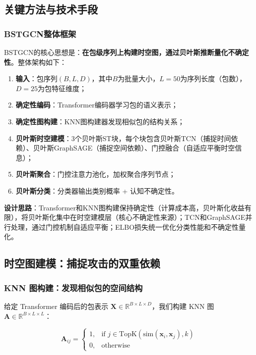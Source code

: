 \subsection{关键方法与技术手段}

\subsubsection{BSTGCN整体框架}

BSTGCN的核心思想是：\textbf{在包级序列上构建时空图，通过贝叶斯推断量化不确定性}。整体架构如下：

\begin{enumerate}
  \item \textbf{输入}：包序列$(B, L, D)$，其中$B$为批量大小，$L=50$为序列长度（包数），$D=25$为包特征维度；
  \item \textbf{确定性编码}：Transformer编码器学习包的语义表示；
  \item \textbf{确定性图构建}：KNN图构建器发现相似包的结构关系；
  \item \textbf{贝叶斯时空建模}：3个贝叶斯ST块，每个块包含贝叶斯TCN（捕捉时间依赖）、贝叶斯GraphSAGE（捕捉空间依赖）、门控融合（自适应平衡时空信息）；
  \item \textbf{贝叶斯聚合}：门控注意力池化，加权聚合序列节点；
  \item \textbf{贝叶斯分类}：分类器输出类别概率 + 认知不确定性。
\end{enumerate}

\textbf{设计思路}：Transformer和KNN图构建保持确定性（计算成本高，贝叶斯化收益有限），将贝叶斯化集中在时空建模层（核心不确定性来源）；TCN和GraphSAGE并行处理，通过门控机制自适应平衡；ELBO损失统一优化分类性能和不确定性量化。

\subsection{时空图建模：捕捉攻击的双重依赖}

\subsubsection{KNN 图构建：发现相似包的空间结构}

给定 Transformer 编码后的包表示 $\mathbf{X} \in \mathbb{R}^{B \times L \times D}$，我们构建 KNN 图 $\mathbf{A} \in \mathbb{R}^{B \times L \times L}$：

\begin{equation}
\mathbf{A}_{ij} = \begin{cases}
1, & \text{if } j \in \text{TopK}(\text{sim}(\mathbf{x}_i, \mathbf{x}_j), k) \\
0, & \text{otherwise}
\end{cases}
\end{equation}

